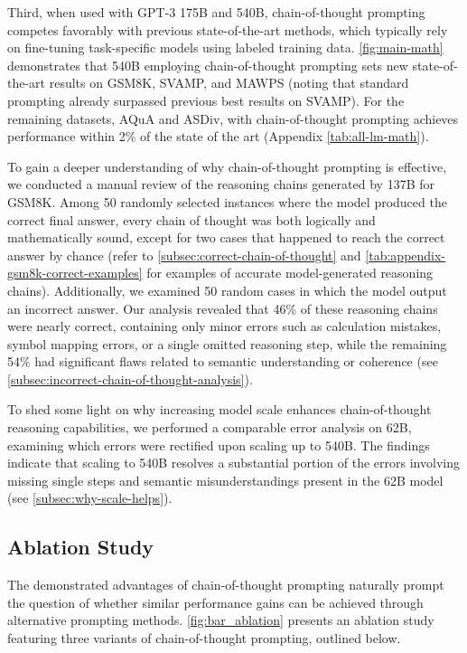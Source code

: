 Third, when used with GPT-3 175B and \palm{} 540B, chain-of-thought prompting competes favorably with previous state-of-the-art methods, which typically rely on fine-tuning task-specific models using labeled training data. \cref{fig:main-math} demonstrates that \palm{} 540B employing chain-of-thought prompting sets new state-of-the-art results on GSM8K, SVAMP, and MAWPS (noting that standard prompting already surpassed previous best results on SVAMP). For the remaining datasets, AQuA and ASDiv, \palm{} with chain-of-thought prompting achieves performance within 2\% of the state of the art (Appendix \cref{tab:all-lm-math}).

To gain a deeper understanding of why chain-of-thought prompting is effective, we conducted a manual review of the reasoning chains generated by \lamda{} 137B for GSM8K. Among 50 randomly selected instances where the model produced the correct final answer, every chain of thought was both logically and mathematically sound, except for two cases that happened to reach the correct answer by chance (refer to \cref{subsec:correct-chain-of-thought} and \cref{tab:appendix-gsm8k-correct-examples} for examples of accurate model-generated reasoning chains). Additionally, we examined 50 random cases in which the model output an incorrect answer. Our analysis revealed that 46\% of these reasoning chains were nearly correct, containing only minor errors such as calculation mistakes, symbol mapping errors, or a single omitted reasoning step, while the remaining 54\% had significant flaws related to semantic understanding or coherence (see \cref{subsec:incorrect-chain-of-thought-analysis}). 

To shed some light on why increasing model scale enhances chain-of-thought reasoning capabilities, we performed a comparable error analysis on \palm{} 62B, examining which errors were rectified upon scaling up to \palm{} 540B. The findings indicate that scaling \palm{} to 540B resolves a substantial portion of the errors involving missing single steps and semantic misunderstandings present in the 62B model (see \cref{subsec:why-scale-helps}).

\subsection{Ablation Study}\label{subsec:math-ablation}

The demonstrated advantages of chain-of-thought prompting naturally prompt the question of whether similar performance gains can be achieved through alternative prompting methods. \cref{fig:bar_ablation} presents an ablation study featuring three variants of chain-of-thought prompting, outlined below.

